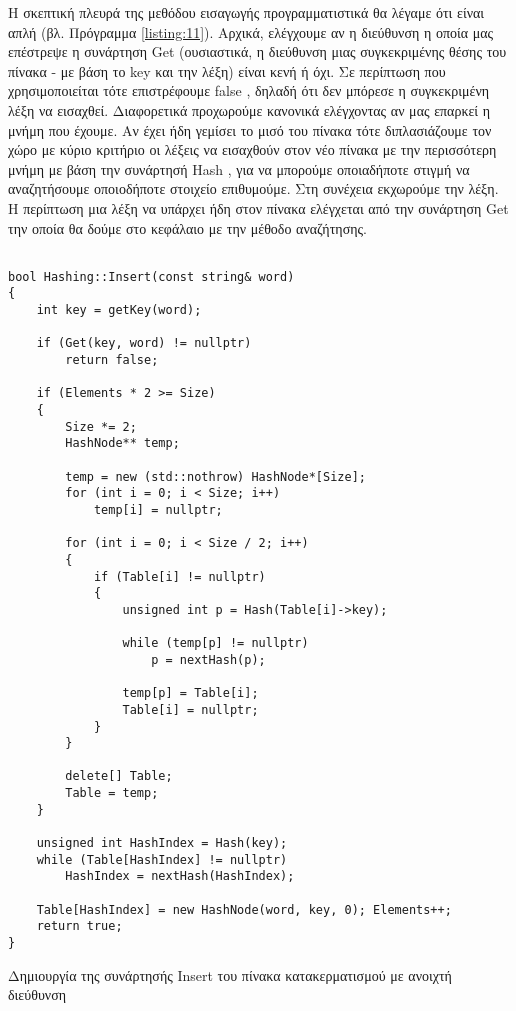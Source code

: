 Η σκεπτική πλευρά της μεθόδου εισαγωγής προγραμματιστικά θα λέγαμε ότι είναι απλή (βλ. Πρόγραμμα \ref{listing:11}). Αρχικά, ελέγχουμε αν η διεύθυνση η οποία μας επέστρεψε η συνάρτηση \en Get \gr (ουσιαστικά, η διεύθυνση μιας συγκεκριμένης θέσης του πίνακα - με βάση το \en key \gr και την λέξη) είναι κενή ή όχι. Σε περίπτωση που χρησιμοποιείται τότε επιστρέφουμε \en false \gr, δηλαδή ότι δεν μπόρεσε η συγκεκριμένη λέξη να εισαχθεί. Διαφορετικά προχωρούμε κανονικά ελέγχοντας αν μας επαρκεί η μνήμη που έχουμε. Αν έχει ήδη γεμίσει το μισό του πίνακα τότε διπλασιάζουμε τον χώρο με κύριο κριτήριο οι λέξεις να εισαχθούν στον νέο πίνακα με την περισσότερη μνήμη με βάση την συνάρτησή \en Hash \gr, για να μπορούμε οποιαδήποτε στιγμή να αναζητήσουμε οποιοδήποτε στοιχείο επιθυμούμε. Στη συνέχεια εκχωρούμε την λέξη. Η περίπτωση μια λέξη να υπάρχει ήδη στον πίνακα ελέγχεται από την συνάρτηση \en Get \gr την οποία θα δούμε στο κεφάλαιο με την μέθοδο αναζήτησης.

\en
\begin{listing}[ht]
\begin{verbatim}

bool Hashing::Insert(const string& word)
{
    int key = getKey(word);

    if (Get(key, word) != nullptr)
        return false;

    if (Elements * 2 >= Size)
    {
        Size *= 2;
        HashNode** temp;

        temp = new (std::nothrow) HashNode*[Size];
        for (int i = 0; i < Size; i++)
            temp[i] = nullptr;

        for (int i = 0; i < Size / 2; i++)
        {
            if (Table[i] != nullptr)
            {
                unsigned int p = Hash(Table[i]->key);

                while (temp[p] != nullptr)
                    p = nextHash(p);

                temp[p] = Table[i];
                Table[i] = nullptr;
            }
        }

        delete[] Table;
        Table = temp;
    }

    unsigned int HashIndex = Hash(key);
    while (Table[HashIndex] != nullptr)
        HashIndex = nextHash(HashIndex);

    Table[HashIndex] = new HashNode(word, key, 0); Elements++;
    return true;
}

\end{verbatim}
\caption{Δημιουργία της συνάρτησής \en Insert \gr του πίνακα κατακερματισμού με ανοιχτή διεύθυνση}
\label{listing:11}
\end{listing}
\gr



